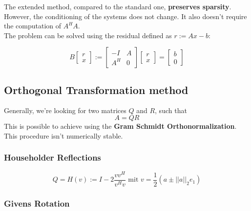 \documentclass[12pt, a4paper]{article}
\begin{document}
The extended method, compared to the standard one, \textbf{preserves sparsity}. However, the conditioning of the systems does not change. It also doesn't require the computation of $A^HA$. \\

The problem can be solved using the residual defined as $r := Ax - b$:

\begin{equation*}
	B\begin{bmatrix}r \\ x \end{bmatrix} := \begin{bmatrix}
		-I & A \\ A^H & 0
	\end{bmatrix} \begin{bmatrix}
		r \\ x
	\end{bmatrix} = \begin{bmatrix}
		b \\ 0
	\end{bmatrix}
\end{equation*}

\subsection{Orthogonal Transformation method}

Generally, we're looking for two matrices $Q$ and $R$, such that
\begin{equation*}
	A = QR
\end{equation*}
This is possible to achieve using the \textbf{Gram Schmidt Orthonormalization}. This procedure isn't numerically stable.

\subsubsection{Householder Reflections}

\begin{tcolorbox}
\begin{equation*}
	Q = H(v) := I - 2\frac{vv^H}{v^Hv}\text{ mit } v = \frac{1}{2}(a \pm ||a||_2 e_1)
\end{equation*}
\end{tcolorbox}

\subsubsection{Givens Rotation}
\end{document}
